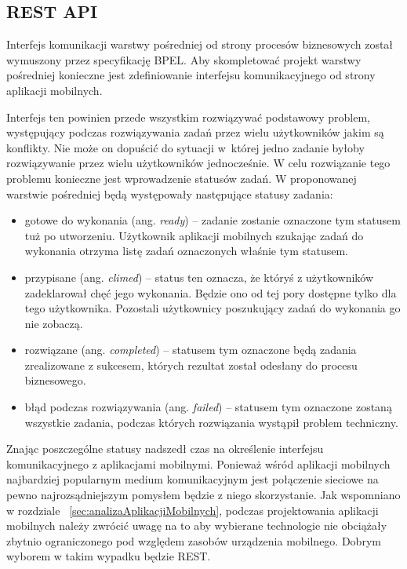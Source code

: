 \subsection{REST API}

Interfejs komunikacji warstwy pośredniej od strony procesów biznesowych został wymuszony przez specyfikację BPEL. Aby skompletować projekt warstwy pośredniej konieczne jest zdefiniowanie interfejsu komunikacyjnego od strony aplikacji mobilnych. 

Interfejs ten powinien przede wszystkim rozwiązywać podstawowy problem, występujący podczas rozwiązywania zadań przez wielu użytkowników jakim są konflikty. Nie może on dopuścić do sytuacji w~której jedno zadanie byłoby rozwiązywanie przez wielu użytkowników jednocześnie. W celu rozwiązanie tego problemu konieczne jest wprowadzenie statusów zadań. W proponowanej warstwie pośredniej będą występowały następujące statusy zadania:

\begin{itemize}
\item gotowe do wykonania (ang. \textit{ready}) -- zadanie zostanie oznaczone tym statusem tuż po utworzeniu. Użytkownik aplikacji mobilnych szukając zadań do wykonania otrzyma listę zadań oznaczonych właśnie tym statusem. 
\item przypisane (ang. \textit{climed}) -- status ten oznacza, że któryś z użytkowników zadeklarował chęć jego wykonania. Będzie ono od tej pory dostępne tylko dla tego użytkownika. Pozostali użytkownicy poszukujący zadań do wykonania go nie zobaczą. 
\item rozwiązane (ang. \textit{completed}) -- statusem tym oznaczone będą zadania zrealizowane z sukcesem, których rezultat został odesłany do procesu biznesowego. 
\item błąd podczas rozwiązywania (ang. \textit{failed}) -- statusem tym oznaczone zostaną wszystkie zadania, podczas których rozwiązania wystąpił problem techniczny. 
\end{itemize}

Znając poszczególne statusy nadszedł czas na określenie interfejsu komunikacyjnego z aplikacjami mobilnymi. Ponieważ wśród aplikacji mobilnych najbardziej popularnym medium komunikacyjnym jest połączenie sieciowe na pewno najrozsądniejszym pomysłem będzie z niego skorzystanie. Jak wspomniano w rozdziale ~\ref{sec:analizaAplikacjiMobilnych}, podczas projektowania aplikacji mobilnych należy zwrócić uwagę na to aby wybierane technologie nie obciążały zbytnio ograniczonego pod względem zasobów urządzenia mobilnego. Dobrym wyborem w takim wypadku będzie REST. 

